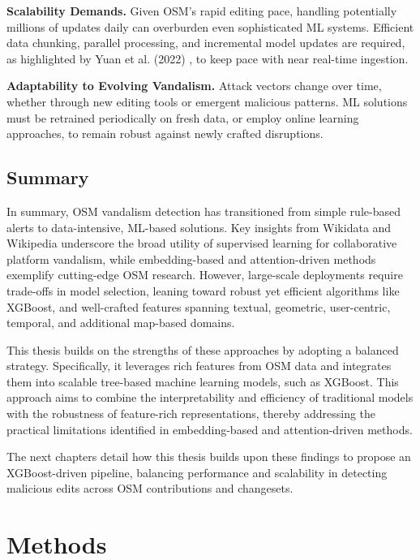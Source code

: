 \documentclass[
    13pt, %
    a4paper, %
    twoside, 
    DIV14, %
    listof=totoc, %
    bibliography=totoc, %
    index=totoc, %
    headsepline
]{scrreprt}
\begin{document}
\noindent
\textbf{Scalability Demands.}
Given OSM’s rapid editing pace, handling potentially millions of updates daily can overburden even sophisticated ML systems. Efficient data chunking, parallel processing, and incremental model updates are required, as highlighted by Yuan et al. (2022) \cite{Yuan2022}, to keep pace with near real-time ingestion.

\noindent
\textbf{Adaptability to Evolving Vandalism.}
Attack vectors change over time, whether through new editing tools or emergent malicious patterns. ML solutions must be retrained periodically on fresh data, or employ online learning approaches, to remain robust against newly crafted disruptions.


\section{Summary}

In summary, OSM vandalism detection has transitioned from simple rule-based alerts to data-intensive, ML-based solutions. Key insights from Wikidata and Wikipedia underscore the broad utility of supervised learning for collaborative platform vandalism, while embedding-based and attention-driven methods exemplify cutting-edge OSM research. However, large-scale deployments require trade-offs in model selection, leaning toward robust yet efficient algorithms like XGBoost, and well-crafted features spanning textual, geometric, user-centric, temporal, and additional map-based domains.

This thesis builds on the strengths of these approaches by adopting a balanced strategy. Specifically, it leverages rich features from OSM data and integrates them into scalable tree-based machine learning models, such as XGBoost. This approach aims to combine the interpretability and efficiency of traditional models with the robustness of feature-rich representations, thereby addressing the practical limitations identified in embedding-based and attention-driven methods.

The next chapters detail how this thesis builds upon these findings to propose an XGBoost-driven pipeline, balancing performance and scalability in detecting malicious edits across OSM contributions and changesets.

\chapter{Methods} \label{methods}
\end{document}
